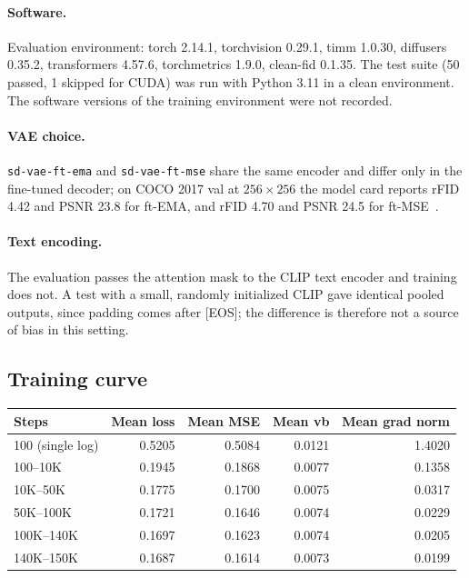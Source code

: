 \documentclass{article}
\begin{document}
\paragraph{Software.}
Evaluation environment: torch 2.14.1, torchvision 0.29.1, timm 1.0.30, diffusers 0.35.2, transformers 4.57.6, torchmetrics 1.9.0, clean-fid 0.1.35.
The test suite (50 passed, 1 skipped for CUDA) was run with Python 3.11 in a clean environment.
The software versions of the training environment were not recorded.

\paragraph{VAE choice.}
\texttt{sd-vae-ft-ema} and \texttt{sd-vae-ft-mse} share the same encoder and differ only in the fine-tuned decoder; on COCO 2017 val at $256\times256$ the model card reports rFID 4.42 and PSNR 23.8 for ft-EMA, and rFID 4.70 and PSNR 24.5 for ft-MSE~\cite{stability_sdvae}.

\paragraph{Text encoding.}
The evaluation passes the attention mask to the CLIP text encoder and training does not. A test with a small, randomly initialized CLIP gave identical pooled outputs, since padding comes after [EOS]; the difference is therefore not a source of bias in this setting.

\subsection{Training curve}
\label{app:curve}

\begin{table}[h]
  \centering
  \small
  \begin{tabular}{@{}lrrrr@{}}
    \toprule
    Steps & Mean loss & Mean MSE & Mean vb & Mean grad norm \\
    \midrule
    100 (single log) & 0.5205 & 0.5084 & 0.0121 & 1.4020 \\
    100--10K & 0.1945 & 0.1868 & 0.0077 & 0.1358 \\
    10K--50K & 0.1775 & 0.1700 & 0.0075 & 0.0317 \\
    50K--100K & 0.1721 & 0.1646 & 0.0074 & 0.0229 \\
    100K--140K & 0.1697 & 0.1623 & 0.0074 & 0.0205 \\
    140K--150K & 0.1687 & 0.1614 & 0.0073 & 0.0199 \\
    \bottomrule
  \end{tabular}
\end{table}
\end{document}
